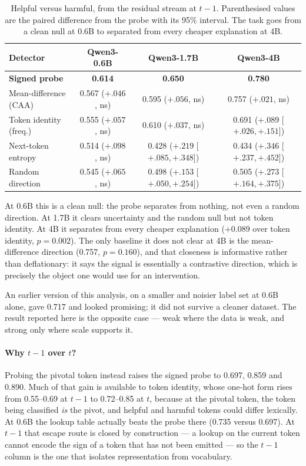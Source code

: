 \documentclass{article}
\begin{document}
\begin{table}[t]
  \centering
  \caption{Helpful versus harmful, from the residual stream at $t-1$.
  Parenthesised values are the paired difference from the probe with its
  95\% interval. The task goes from a clean null at 0.6B to separated from
  every cheaper explanation at 4B.}
  \label{tab:signed}
  \small
  \begin{tabular}{lccc}
    \toprule
    Detector & Qwen3-0.6B & Qwen3-1.7B & Qwen3-4B \\
    \midrule
    \textbf{Signed probe} & \textbf{0.614} & \textbf{0.650} & \textbf{0.780} \\
    Mean-difference (CAA) & 0.567 \tiny{($+.046$, ns)} & 0.595 \tiny{($+.056$, ns)} & 0.757 \tiny{($+.021$, ns)} \\
    Token identity (freq.) & 0.555 \tiny{($+.057$, ns)} & 0.610 \tiny{($+.037$, ns)} & 0.691 \tiny{($+.089$ [$+.026,+.151$])} \\
    Next-token entropy & 0.514 \tiny{($+.098$, ns)} & 0.428 \tiny{($+.219$ [$+.085,+.348$])} & 0.434 \tiny{($+.346$ [$+.237,+.452$])} \\
    Random direction & 0.545 \tiny{($+.065$, ns)} & 0.498 \tiny{($+.153$ [$+.050,+.254$])} & 0.505 \tiny{($+.273$ [$+.164,+.375$])} \\
    \bottomrule
  \end{tabular}
\end{table}

At 0.6B this is a clean null: the probe separates from nothing, not even a
random direction. At 1.7B it clears uncertainty and the random null but not
token identity. At 4B it separates from every cheaper explanation
($+0.089$ over token identity, $p{=}0.002$). The only baseline it does not
clear at 4B is the mean-difference direction (0.757, $p{=}0.160$), and that
closeness is informative rather than deflationary: it says the signal is
essentially a contrastive direction, which is precisely the object one
would use for an intervention.

An earlier version of this analysis, on a smaller and noisier label set at
0.6B alone, gave 0.717 and looked promising; it did not survive a cleaner
dataset. The result reported here is the opposite case --- weak where the
data is weak, and strong only where scale supports it.

\paragraph{Why $t-1$ over $t$?}
Probing the pivotal token instead raises the signed probe to 0.697, 0.859 and
0.890. Much of that gain is available to token identity, whose one-hot form
rises from 0.55--0.69 at $t-1$ to 0.72--0.85 at $t$, 
because at the pivotal token, the token being classified \emph{is} the pivot, 
and helpful and harmful tokens could differ lexically. 
At 0.6B the lookup table actually beats the probe there (0.735
versus 0.697). At $t-1$ that escape route is closed by construction --- a
lookup on the current token cannot encode the sign of a token that has not
been emitted --- so the $t-1$ column is the one that isolates representation
from vocabulary.
\end{document}
